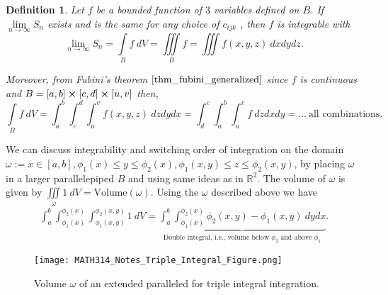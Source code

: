 \documentclass[
	12pt,
	]{article}
\newcommand{\R}{\mathbb{R}}
\theoremstyle{custom}
\theoremstyle{custom}
\theoremstyle{custom}
\theoremstyle{custom}
\newtheorem{definition}{Definition}[section]
\theoremstyle{custom}
\theoremstyle{definition}
\theoremstyle{example}
\theoremstyle{note}
\theoremstyle{remark}
\theoremstyle{example}
\newcounter{theo}[section]\setcounter{theo}{0}
\numberwithin{equation}{subsection}
\begin{document}
  			\begin{definition}
  				Let $f$ be a bounded function of $3$ variables defined on $B$. If $\lim\limits_{n\to \infty}S_{n}$ exists and is the same for any choice of $c_{ijk}$ , then $f$ is integrable  with 
  				\begin{equation} 
  				\lim\limits_{n\to \infty}S_{n} = \int\limits_B f \ dV = \iiint\limits_B f = \iiint f(x,y,z) \ dxdydz.
  				\end{equation}
  				
  				Moreover, from Fubini's theorem $\eqref{thm_fubini_generalized}$ since $f$ is continuous and $B = [a,b] \cross [c,d] \cross[u,v]$ then,
  				\begin{equation} 
  				\int\limits_B f \ dV = \int_{a}^{b} \int_{c}^{d}\int_{u}^{v} f(x,y,z) \ dzdydx = \int_{d}^{c} \int_{a}^{b} \int_{u}^{v} f \ dzdxdy = \dots \  \text{all combinations.}
  				\end{equation}
  			\end{definition}
  			 
  			 \noindent We can discuss integrability and switching order of integration on the domain \\$\omega := x\in [a,b] , \phi_{1}(x) \le y \le \phi_{2}(x), \phi_{1}(x,y) \le z \le \phi_{2}(x,y)$, by placing $\omega$ in a larger parallelepiped $B$ and using same ideas as in $\R^{2}$. 
  			 The volume of $\omega$ is given by $\iiint\limits_\omega 1 \ dV = \text{Volume}(\omega)$.
  			 Using the $\omega$ described above we have 
  			 \begin{gather*}
  			 	\int_{a}^{b} \int_{\phi_{1}(x)}^{\phi_{2}(x)} \int_{\phi_{1}(x,y)}^{\phi_{2}(x,y)} 1 \ dV = \underbrace{\int_{a}^{b} \int_{\phi_{1}(x)}^{\phi_{2}(x)} \phi_{2}(x,y) - \phi_{1}(x,y) \ dydx}_{\text{Double integral, i.e., volume below $\phi_{2}$ and above $\phi_{1}$}}.
  			 \end{gather*}
	  			 \begin{figure}[H]
  			 		\centering
  			 		\texttt{[image: MATH314\_Notes\_Triple\_Integral\_Figure.png]}
  			 		\captionsetup{margin=1cm, justification=raggedright}\caption{Volume $\omega$ of an extended paralleled for triple integral integration.}
  			 \end{figure}
  			
\end{document}
